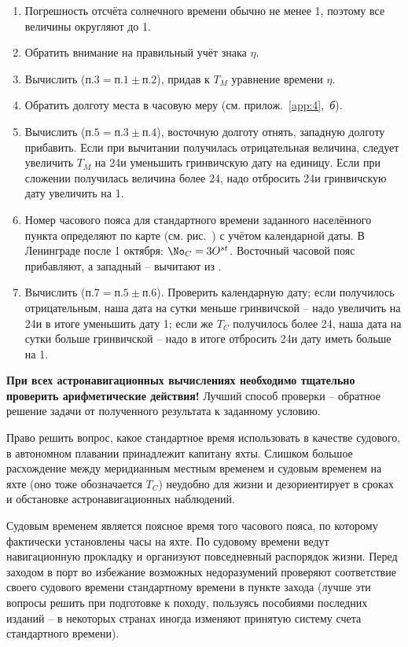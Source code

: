 \begin{small}
  \begin{enumerate} 
  \item Погрешность отсчёта солнечного времени обычно не менее 1\tmin,
    поэтому все величины округляют до 1\tmin.
  \item Обратить внимание на правильный учёт знака $\eta$.
  \item Вычислить ($\text{п.}3 = \text{п.}1 \pm \text{п.}2$), придав к
    $T_M$ уравнение времени $\eta$.
  \item Обратить долготу места в часовую меру
    (см. прилож.~\ref{app:4},~\textit{б}).
  \item Вычислить ($\text{п.}5 = \text{п.}3 \pm \text{п.}4$),
    восточную долготу отнять, западную долготу прибавить. Если при
    вычитании получилась отрицательная величина, следует увеличить
    $T_M$ на 24\thr и уменьшить гринвичскую дату на единицу. Если при
    сложении получилась величина более 24\thr, надо отбросить 24\thr и
    гринвичскую дату увеличить на 1\tday.
  \item Номер часового пояса для стандартного времени заданного
    населённого пункта определяют по карте (см. рис.~) с
    учётом календарной даты. В Ленинграде после 1 октября:
    $\mathNo_C = 3 \Ost$. Восточный часовой пояс прибавляют, а
    западный \--- вычитают из \Tgr.
  \item Вычислить ($\text{п.}7 = \text{п.}5 \pm
    \text{п.}6$). Проверить календарную дату; если 
    получилось отрицательным, наша дата на сутки меньше гринвичской
    \--- надо увеличить \Tgr на 24\thr и в итоге уменьшить дату
    1\tday; если же $T_C$ получилось более 24\thr, наша дата на сутки
    больше гринвичской \--- надо в итоге отбросить 24\thr и дату иметь
    больше на 1\tday.
  \end{enumerate}
\end{small}
  
\textbf{При всех астронавигационных вычислениях необходимо тщательно
  проверить арифметические действия!}  Лучший способ проверки \---
обратное решение задачи от полученного результата к заданному условию.

Право решить вопрос, какое стандартное время использовать в качестве судового, в автономном плавании принадлежит капитану яхты. Слишком большое расхождение между меридианным местным временем и судовым временем на яхте (оно тоже обозначается $T_C$) неудобно для жизни и дезориентирует в сроках и обстановке астронавигационных наблюдений.

Судовым временем является поясное время того часового пояса, по которому фактически установлены часы на яхте. По судовому времени ведут навигационную прокладку и организуют повседневный распорядок жизни. Перед заходом в порт во избежание возможных недоразумений проверяют соответствие своего судового времени стандартному времени в пункте захода (лучше эти вопросы решить при подготовке к походу, пользуясь пособиями последних изданий \--- в некоторых странах иногда изменяют принятую систему счета стандартного времени).

